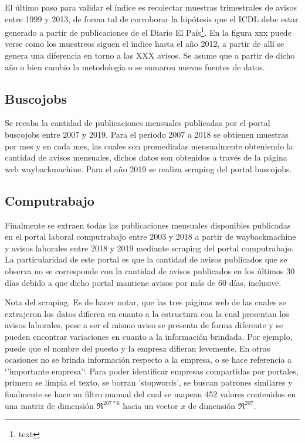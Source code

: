 \documentclass[12pt,twoside]{reedthesis}
\begin{document}
El último paso para validar el índice es recolectar muestras trimestrales de avisos entre 1999 y 2013, de forma tal de corroborar la hipótesis que el ICDL debe estar generado a partir de publicaciones de el Diario El País\footnote{text}. En la figura xxx puede verse como los muestreos siguen el índice hasta el año 2012, a partir de allí se genera una diferencia en torno a las XXX avisos. Se asume que a partir de dicho año o bien cambio la metodología o se sumaron nuevas fuentes de datos.

\hypertarget{buscojobs}{%
\subsection*{Buscojobs}\label{buscojobs}}

Se recaba la cantidad de publicaciones mensuales publicadas por el portal buscojobs entre 2007 y 2019. Para el periodo 2007 a 2018 se obtienen muestras por mes y en cada mes, las cuales son promediadas mensualmente obteniendo la cantidad de avisos mensuales, dichos datos son obtenidos a través de la página web waybackmachine.
Para el año 2019 se realiza scraping del portal buscojobs.

\hypertarget{computrabajo}{%
\subsection*{Computrabajo}\label{computrabajo}}

Finalmente se extraen todas las publicaciones mensuales disponibles publicadas en el portal laboral computrabajo entre 2003 y 2018 a partir de waybackmachine y avisos laborales entre 2018 y 2019 mediante scraping del portal computrabajo. La particularidad de este portal es que la cantidad de avisos publicados que se observa no se corresponde con la cantidad de avisos publicados en los últimos 30 días debido a que dicho portal mantiene avisos por más de 60 días, inclusive.

Nota del scraping. Es de hacer notar, que las tres páginas web de las cuales se extrajeron los datos difieren en cuanto a la estructura con la cual presentan los avisos laborales, pese a ser el mismo aviso se presenta de forma diferente y se pueden encontrar variaciones en cuanto a la información brindada. Por ejemplo, puede que el nombre del puesto y la empresa difieran levemente. En otras ocasiones no se brinda información respecto a la empresa, o se hace referencia a `'importante empresa'`. Para poder identificar empresas compartidas por portales, primero se limpia el texto, se borran 'stopwords', se buscan patrones similares y finalmente se hace un filtro manual del cual se mapean 452 valores contenidos en una matriz de dimensión \(\Re^{207*6}\) hacia un vector \(x\) de dimensión \(\Re^{207}\).
\end{document}

